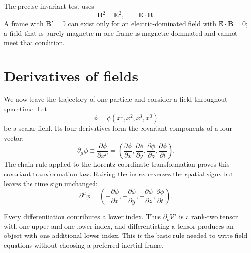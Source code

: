 The precise invariant test uses
\begin{equation}
  \boldsymbol B^2-\boldsymbol E^2,
  \qquad
  \boldsymbol E\cdot\boldsymbol B.
\end{equation}
A frame with \(\boldsymbol B'=0\) can exist only for an electric-dominated
field with \(\boldsymbol E\cdot\boldsymbol B=0\); a field that is purely
magnetic in one frame is magnetic-dominated and cannot meet that condition.

\begin{classroomqa}
\end{classroomqa}

\section{Derivatives of fields}

We now leave the trajectory of one particle and consider a field throughout
spacetime. Let
\begin{equation}
  \phi=\phi(x^1,x^2,x^3,x^0)
\end{equation}
be a scalar field. Its four derivatives form the covariant components of a
four-vector:
\begin{equation}
  \partial_\mu\phi
  \equiv\frac{\partial\phi}{\partial x^\mu}
  =\left(
    \frac{\partial\phi}{\partial x},
    \frac{\partial\phi}{\partial y},
    \frac{\partial\phi}{\partial z},
    \frac{\partial\phi}{\partial t}
  \right).
\end{equation}
The chain rule applied to the Lorentz coordinate transformation proves this
covariant transformation law. Raising the index reverses the spatial signs
but leaves the time sign unchanged:
\begin{equation}
  \partial^\mu\phi
  =\left(
    -\frac{\partial\phi}{\partial x},
    -\frac{\partial\phi}{\partial y},
    -\frac{\partial\phi}{\partial z},
    \frac{\partial\phi}{\partial t}
  \right).
\end{equation}

Every differentiation contributes a lower index. Thus
\(\partial_\nu V^\mu\) is a rank-two tensor with one upper and one lower
index, and differentiating a tensor produces an object with one additional
lower index. This is the basic rule needed to write field equations without
choosing a preferred inertial frame.

